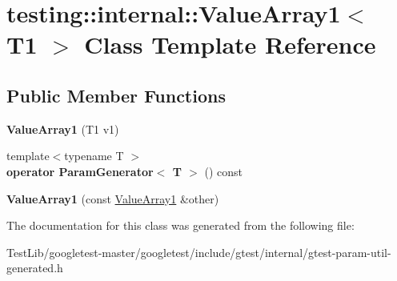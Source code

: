 \hypertarget{classtesting_1_1internal_1_1ValueArray1}{}\section{testing\+:\+:internal\+:\+:Value\+Array1$<$ T1 $>$ Class Template Reference}
\label{classtesting_1_1internal_1_1ValueArray1}
\subsection*{Public Member Functions}
\begin{DoxyCompactItemize}
\item 
\mbox{\label{classtesting_1_1internal_1_1ValueArray1_a8eaffed25a4ddbe790472ca07595a319}} 
{\bfseries Value\+Array1} (T1 v1)
\item 
\mbox{\label{classtesting_1_1internal_1_1ValueArray1_a1ffe0a28fd09efa980df1aaa3f7af2a0}} 
{\footnotesize template$<$typename T $>$ }\\{\bfseries operator Param\+Generator$<$ T $>$} () const
\item 
\mbox{\label{classtesting_1_1internal_1_1ValueArray1_a54a3968da3354334cb4d730f5254e216}} 
{\bfseries Value\+Array1} (const \hyperlink{classtesting_1_1internal_1_1ValueArray1}{Value\+Array1} \&other)
\end{DoxyCompactItemize}


The documentation for this class was generated from the following file\+:\begin{DoxyCompactItemize}
\item 
Test\+Lib/googletest-\/master/googletest/include/gtest/internal/gtest-\/param-\/util-\/generated.\+h\end{DoxyCompactItemize}
